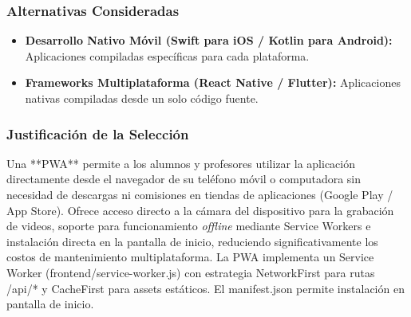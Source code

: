 \subsubsection{Alternativas Consideradas}
\begin{itemize}
    \item \textbf{Desarrollo Nativo Móvil (Swift para iOS / Kotlin para Android):} Aplicaciones compiladas específicas para cada plataforma.
    \item \textbf{Frameworks Multiplataforma (React Native / Flutter):} Aplicaciones nativas compiladas desde un solo código fuente.
\end{itemize}

\subsubsection{Justificación de la Selección}
Una **PWA** permite a los alumnos y profesores utilizar la aplicación directamente desde el navegador de su teléfono móvil o computadora sin necesidad de descargas ni comisiones en tiendas de aplicaciones (Google Play / App Store). Ofrece acceso directo a la cámara del dispositivo para la grabación de videos, soporte para funcionamiento \textit{offline} mediante Service Workers e instalación directa en la pantalla de inicio, reduciendo significativamente los costos de mantenimiento multiplataforma. La PWA implementa un Service Worker (frontend/service-worker.js) con estrategia NetworkFirst para rutas /api/* y CacheFirst para assets estáticos. El manifest.json permite instalación en pantalla de inicio.
